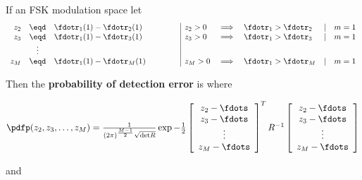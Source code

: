 \begin{theorem}
If an FSK modulation space let
\[
\begin{array}{rcl l| lllll}
   z_2 &\eqd& \fdotr_{1}(1) - \fdotr_{2}(1) &\hspace{1cm}& z_2>0 &\implies& \fdotr_1>\fdotr_2 &|& m=1 \\
   z_3 &\eqd& \fdotr_{1}(1) - \fdotr_{3}(1) &\hspace{1cm}& z_3>0 &\implies& \fdotr_1>\fdotr_3 &|& m=1 \\
       &\vdots&                               &            & \\
   z_M &\eqd& \fdotr_{1}(1) - \fdotr_{M}(1) &\hspace{1cm}& z_M>0 &\implies& \fdotr_1>\fdotr_M &|& m=1 \\
\end{array}
\]

Then the {\bf probability of detection error} is
where

\begin{math}
\pdfp(z_2,z_3,\ldots,z_M)
   =
   \frac{1}{(2\pi)^\frac{M-1}{2}\sqrt{\mathrm{det}{R}}}
   \exp{
      -\frac{1}{2}
      \left[
      \begin{array}{c}
         z_2 - \fdots \\
         z_3 - \fdots \\
         \vdots \\
         z_M - \fdots
      \end{array}
      \right]^T
      R^{-1}
      \left[
      \begin{array}{c}
         z_2 - \fdots \\
         z_3 - \fdots \\
         \vdots \\
         z_M - \fdots
      \end{array}
      \right]
   }
\end{math}

and


\end{theorem}
